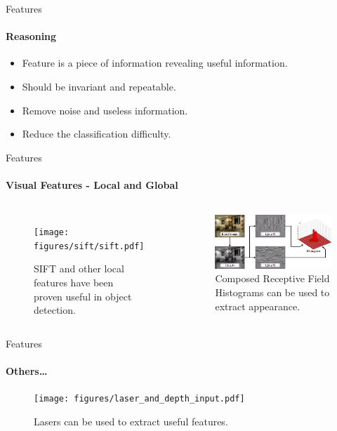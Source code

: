 \documentclass[compress]{beamer}
\begin{document}
\begin{frame}{Features}
\framesubtitle{Reasoning}
    \begin{itemize}
        \item Feature is a piece of information revealing useful information.
        \item Should be invariant and repeatable.
        \item Remove noise and useless information.
        \item Reduce the classification difficulty.
    \end{itemize}
\end{frame}


\begin{frame}{Features}
\framesubtitle{Visual Features - Local and Global}
    \begin{columns}[t]

    \begin{figure}
        \texttt{[image: figures/sift/sift.pdf]}
        \caption{SIFT and other local features have been proven useful in object detection.}
    \end{figure}
    \begin{figure}
    \includegraphics[width=\textwidth]{figures/crfh_model.jpg}
    \caption{Composed Receptive Field Histograms can be used to extract appearance.}
    \end{figure}
    \end{columns}
\end{frame}

\begin{frame}{Features}
\framesubtitle{Others\dots}
    \begin{figure}
    \texttt{[image: figures/laser\_and\_depth\_input.pdf]}
    \caption{Lasers can be used to extract useful features.}
    \end{figure}
\end{frame}
\end{document}
